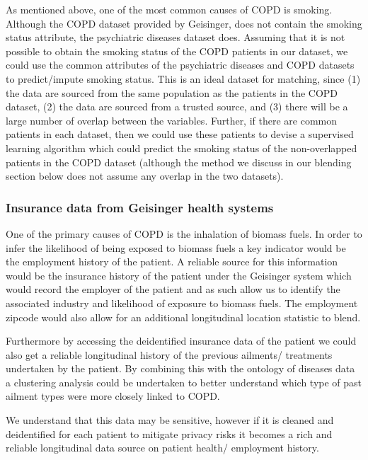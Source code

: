 \documentclass{article}
\begin{document}
As mentioned above, one of the most common causes of COPD is smoking. Although the COPD dataset provided by Geisinger, does not contain the smoking status attribute, the psychiatric diseases dataset does. Assuming that it is not possible to obtain the smoking status of the COPD patients in our dataset, we could use the common attributes of the psychiatric diseases and COPD datasets to predict/impute smoking status. This is an ideal dataset for matching, since (1) the data are sourced from the same population as the patients in the COPD dataset, (2) the data are sourced from a trusted source, and (3) there will be a large number of overlap between the variables. Further, if there are common patients in each dataset, then we could use these patients to devise a supervised learning algorithm which could predict the smoking status of the non-overlapped patients in the COPD dataset (although the method we discuss in our blending section below does not assume any overlap in the two datasets).


\subsubsection{Insurance data from Geisinger health systems}

\noindent One of the primary causes of COPD is the inhalation of biomass fuels. In order to infer the likelihood of being exposed to biomass fuels a key indicator would be the employment history of the patient. A reliable source for this information would be the insurance history of the patient under the Geisinger system which would record the employer of the patient and as such allow us to identify the associated industry and likelihood of exposure to biomass fuels. The employment zipcode 
would also allow for an additional longitudinal location statistic to blend.

Furthermore by accessing the deidentified insurance data of the patient 
we could also get a reliable longitudinal history of the previous ailments/ treatments undertaken by the patient. By combining this with the ontology of diseases data a clustering analysis could be undertaken to better understand which type of past ailment types were more closely linked to COPD.

We understand that this data may be sensitive, however if it is 
cleaned and deidentified for each patient to mitigate privacy risks it becomes a rich and reliable longitudinal data source on patient health/ employment history.
\end{document}
